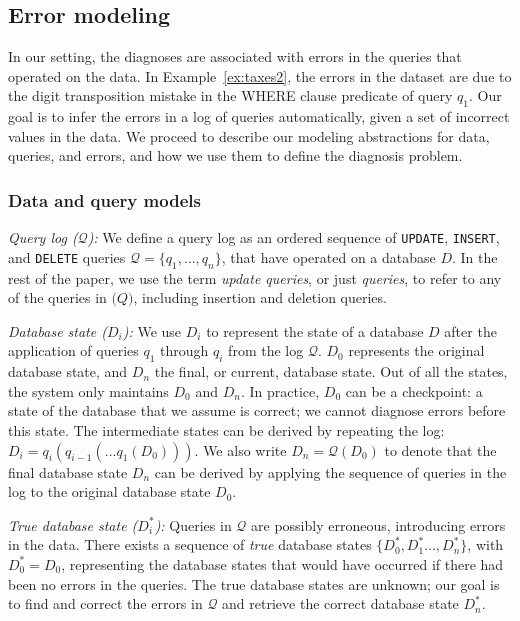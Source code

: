 

\subsection{Error modeling}
\label{sec:model}

In our setting, the diagnoses are associated with errors in the queries that
operated on the data. In Example~\ref{ex:taxes2}, the errors in the dataset
are due to the digit transposition mistake in the WHERE clause predicate of
query $q_1$. Our goal is to infer the errors in a log of queries
automatically, given a set of incorrect values in the data. We proceed to
describe our modeling abstractions for data, queries, and errors, and how we
use them to define the diagnosis problem.

\subsubsection*{Data and query models}

\noindent
\emph{Query log ($\mathcal{Q}$):}
We define a query log as an ordered sequence of \texttt{UPDATE}, \texttt{INSERT}, and
\texttt{DELETE} queries $\mathcal{Q}=\{q_1,\dots,q_n\}$, that have
operated on a database $D$. In the rest of the paper, we use the term
\emph{update queries}, or just \emph{queries}, to refer to any of the queries in $\mathcal(Q)$,
including insertion and deletion queries.

\smallskip
\noindent
\emph{Database state ($D_i$):}
We use $D_i$ to represent the state of a database $D$ after the application of
queries $q_1$ through $q_i$ from the log $\mathcal{Q}$. $D_0$ represents the
original database state, and $D_n$ the final, or current, database state. Out
of all the states, the system only maintains $D_0$ and $D_n$. In practice,
$D_0$ can be a checkpoint: a state of the database that we assume is correct;
we cannot diagnose errors before this state. The intermediate states can be
derived by repeating the log: $D_i=q_i(q_{i-1}(\dots q_1(D_0)))$. We also
write $D_n=\mathcal{Q}(D_0)$ to denote that the final database state $D_n$ can
be derived by applying the sequence of queries in the log to the original
database state $D_0$.

\smallskip
\noindent
\emph{True database state ($D_i^*$):}
Queries in $\mathcal{Q}$ are possibly erroneous, introducing errors in the
data. There exists a sequence of \emph{true} database states $\{D_0^*,
D_1^*\dots, D_n^*\}$, with $D_0^*=D_0$, representing the database states that
would have occurred if there had been no errors in the queries.
The true database states are unknown; our goal is to find and correct the errors in $\mathcal{Q}$ and retrieve the correct database state $D_n^*$.

